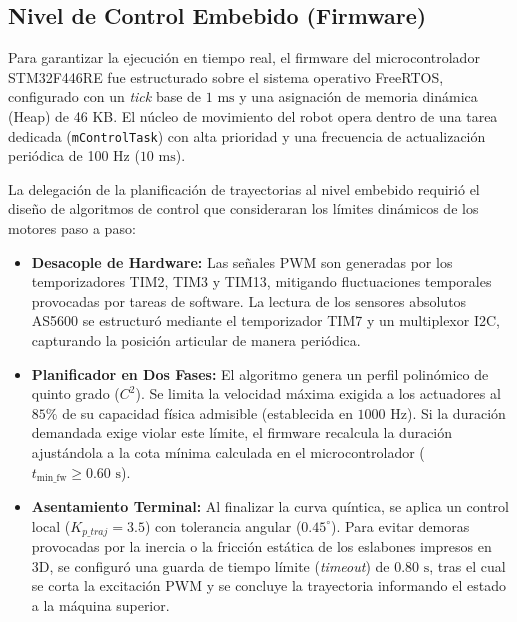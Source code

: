 \documentclass[12pt, a4paper]{report}
\begin{document}
\subsection{Nivel de Control Embebido (Firmware)}
Para garantizar la ejecución en tiempo real, el firmware del microcontrolador STM32F446RE fue estructurado sobre el sistema operativo FreeRTOS, configurado con un \textit{tick} base de $1\text{ ms}$ y una asignación de memoria dinámica (Heap) de 46 KB. El núcleo de movimiento del robot opera dentro de una tarea dedicada (\texttt{mControlTask}) con alta prioridad y una frecuencia de actualización periódica de 100 Hz ($10\text{ ms}$).

La delegación de la planificación de trayectorias al nivel embebido requirió el diseño de algoritmos de control que consideraran los límites dinámicos de los motores paso a paso:
\begin{itemize}
    \item \textbf{Desacople de Hardware:} Las señales PWM son generadas por los temporizadores TIM2, TIM3 y TIM13, mitigando fluctuaciones temporales provocadas por tareas de software. La lectura de los sensores absolutos AS5600 se estructuró mediante el temporizador TIM7 y un multiplexor I2C, capturando la posición articular de manera periódica.
    \item \textbf{Planificador en Dos Fases:} El algoritmo genera un perfil polinómico de quinto grado ($C^2$). Se limita la velocidad máxima exigida a los actuadores al $85\%$ de su capacidad física admisible (establecida en $1000\text{ Hz}$). Si la duración demandada exige violar este límite, el firmware recalcula la duración ajustándola a la cota mínima calculada en el microcontrolador ($t_{\text{min\_fw}} \ge 0.60\text{ s}$).
    \item \textbf{Asentamiento Terminal:} Al finalizar la curva quíntica, se aplica un control local ($K_{p\_traj} = 3.5$) con tolerancia angular ($0.45^\circ$). Para evitar demoras provocadas por la inercia o la fricción estática de los eslabones impresos en 3D, se configuró una guarda de tiempo límite (\textit{timeout}) de $0.80\text{ s}$, tras el cual se corta la excitación PWM y se concluye la trayectoria informando el estado a la máquina superior.
\end{itemize}
\end{document}
